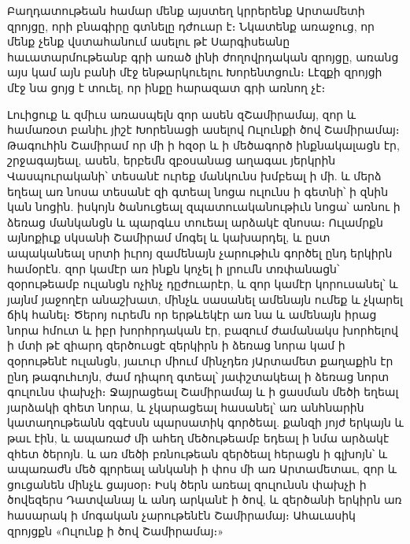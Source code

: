 \documentclass{article}
\begin{document}
{Բաղդատութեան համար մենք այստեղ կրրերենք Արտամետի զրոյցը, որի բնագիրը գտնելը դժուար է։ Նկատենք առաջուց, որ մենք չենք վստահանում ասելու թէ Սարգիսեանը հաւատարմութեանբ գրի առած լինի ժողովրդական զրոյցը, առանց այս կամ այն բանի մէջ ենթարկուելու Խորենտցուն։ Լէզքի զրոյցի մէջ նա ցոյց է տուել, որ ինքը հարազատ գրի առնող չէ։

Լուիցուք և զմիւս առասպելն զոր ասեն զՇամիրամայ, զոր և համառօտ բանիւ յիշէ Խորենացի ասելով Ուլունքի ծով Շամիրամայ։ Թագուհին Շամիրամ որ մի ի հզօր և ի մեծագործ ինքնակալացն էր, շրջագայեալ, ասեն, երբեմն զբօսանաց աղագաւ յերկրին Վասպուրականի՝ տեսանէ ուրեք մանկունս խմբեալ ի մի. և մերձ եղեալ առ նոսա տեսանէ զի գտեալ նոցա ուլունս ի գետնի՝ ի զնին կան նոցին. իսկոյն ծանուցեալ զպատուականութիւն նոցա՝ առնու ի ձեռաց մանկանցն և պարգևս տուեալ արձակէ զնոսա։ Ուլամրքն այնոքիւք սկսանի Շամիրամ մոգել և կախարդել, և ըստ ապականեալ սրտի իւրոյ զամենայն չարութիւն գործել ընդ երկիրն համօրէն. զոր կամէր առ ինքն կոչել ի լրումն տռփանացն՝ զօրութեամբ ուլանցն ոչինչ դըժուարէր, և զոր կամէր կորուսանել՝ և յայնմ յաջողէր անաշխատ, մինչև սասանել ամենայն ումեք և չկարել ճիկ հանել։ Ծերոյ ուրեմն որ երթևեկէր առ նա և ամենայն իրաց նորա հմուտ և իբր խորհրդական էր, բազում ժամանակս խորհելով ի մտի թէ զիարդ զերծուսցէ զերկիրն ի ձեռաց նորա կամ ի զօրութենէ ուլանցն, յաւուր միում մինչդեռ յԱրտամետ քաղաքին էր ընդ թագուհւոյն, ժամ դիպող գտեալ՝ յափշտակեալ ի ձեռաց նորտ գուլունս փախչի։ Ջայրացեալ Շամիրամայ և ի ցասման մեծի եղեալ յարձակի զհետ նորա, և չկարացեալ հասանել՝ առ անհնարին կատաղութեանն զգէսսն պարսատիկ գործեալ. քանզի յոյժ երկայն և թաւ էին, և ապառաժ մի ահեղ մեծութեամբ եդեալ ի նմա արձակէ զհետ ծերոյն. և առ մեծի բռնութեան զերծեալ հերացն ի գլխոյն՝ և ապառաժն մեծ գլորեալ անկանի ի փոս մի առ Արտամետաւ, զոր և ցուցանեն մինչև ցայսօր։ Իսկ ծերն առեալ զուլունսն փախչի ի ծովեզերս Դատվանայ և անդ արկանէ ի ծով, և զերծանի երկիրն առ հասարակ ի մոգական չարութենէն Շամիրամայ։ Ահաւասիկ զրոյցքն «Ուլունք ի ծով Շամիրամայ։»

}
\end{document}
